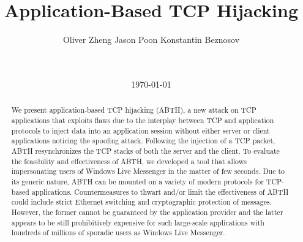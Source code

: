 \documentclass{sig-alternate}
\begin{document}

\title{
Application-Based TCP Hijacking
}

\author {
Oliver Zheng \hspace{2.4cm}  Jason Poon \hspace{1.5cm}  Konstantin Beznosov\\
	 \\
	 \\
}

\date{\today}

\maketitle

\begin{abstract}
We present application-based TCP hijacking (ABTH), a new attack on TCP applications that exploits flaws due to the interplay between TCP and application protocols to inject data into an application session without either server or client applications noticing the spoofing attack. 
Following the injection of a TCP packet, ABTH resynchronizes the TCP stacks of both the server and the client.
To evaluate the feasibility and effectiveness of ABTH, we developed a tool that allows impersonating users of Windows Live Messenger in the matter of few seconds. 
Due to its generic nature, ABTH can be mounted on a variety of modern protocols for TCP-based applications.
Countermeasures to thwart and/or limit the effectiveness of ABTH could include strict Ethernet switching and cryptographic protection of messages.
However, the former cannot be guaranteed by the application provider and the latter appears to be still prohibitively expensive for such large-scale applications with hundreds of millions of sporadic users as Windows Live Messenger.
\end{abstract}
\end{document}
